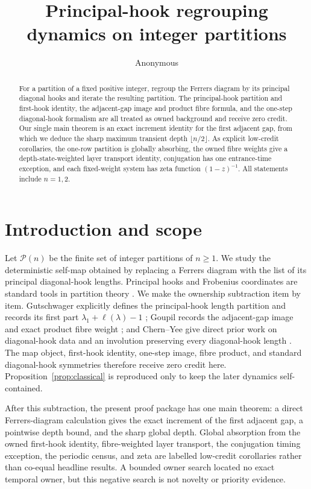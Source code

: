 \documentclass[10pt]{amsart}
\title[Principal-hook partition dynamics]{Principal-hook regrouping dynamics on integer partitions}
\author{Anonymous}
\date{}
\theoremstyle{definition}
\newcommand{\Par}{\mathcal P}
\begin{document}
\begin{abstract}
For a partition of a fixed positive integer, regroup the Ferrers diagram by
its principal diagonal hooks and iterate the resulting partition.  The
principal-hook partition and first-hook identity, the adjacent-gap image and
product fibre formula, and the one-step diagonal-hook formalism are all
treated as owned background and receive zero credit.  Our single main theorem
is an exact increment identity for the first adjacent gap, from which we
deduce the sharp maximum transient depth $\lfloor n/2\rfloor$.  As explicit
low-credit corollaries, the one-row partition is globally absorbing, the
owned fibre weights give a depth-state-weighted layer transport identity,
conjugation has one entrance-time exception, and each fixed-weight system has
zeta function $(1-z)^{-1}$.  All statements include $n=1,2$.
\end{abstract}

\maketitle

\section{Introduction and scope}

Let $\Par(n)$ be the finite set of integer partitions of $n\geq 1$.  We study
the deterministic self-map obtained by replacing a Ferrers diagram with the
list of its principal diagonal-hook lengths.  Principal hooks and Frobenius
coordinates are standard tools in partition theory \cite{Andrews1998}.  We
make the ownership subtraction item by item.  Gutschwager explicitly defines
the principal-hook length partition and records its first part
$\lambda_1+\ell(\lambda)-1$ \cite{Gutschwager2011}; Goupil records the
adjacent-gap image and exact product fibre weight \cite{Goupil2009}; and
Chern--Yee give direct prior work on diagonal-hook data and an involution
preserving every diagonal-hook length \cite{ChernYee2022}.  The map object,
first-hook identity, one-step image, fibre product, and standard
diagonal-hook symmetries therefore receive zero credit here.
Proposition~\ref{prop:classical} is reproduced only to keep the later dynamics
self-contained.

After this subtraction, the present proof package has one main theorem: a
direct Ferrers-diagram calculation gives the exact increment of the first
adjacent gap, a pointwise depth bound, and the sharp global depth.  Global
absorption from the owned first-hook identity, fibre-weighted layer transport,
the conjugation timing exception, the periodic census, and zeta are labelled
low-credit corollaries rather than co-equal headline results.  A bounded owner
search located no exact temporal owner, but this negative search is not
novelty or priority evidence.
\end{document}
